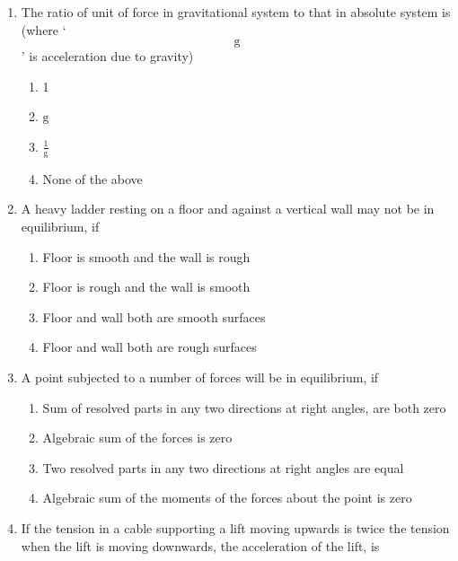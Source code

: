 \documentclass[11pt,a4paper]{article}
\begin{document}
\begin{enumerate}
\\
\item{The ratio of unit of force in gravitational system to that in absolute system is (where `$${\text{g}}$$' is acceleration due to gravity)
}
\begin{enumerate}[label=\Alph*.]
\item{1}
\item{$ {\text{g}} $}
\item{$ \frac{1}{{\text{g}}} $}
\item{None of the above}
\end{enumerate}
\item{A heavy ladder resting on a floor and against a vertical wall may not be in equilibrium, if}
\begin{enumerate}[label=\Alph*.]
\item{Floor is smooth and the wall is rough}
\item{Floor is rough and the wall is smooth}
\item{Floor and wall both are smooth surfaces}
\item{Floor and wall both are rough surfaces}
\end{enumerate}
\item{A point subjected to a number of forces will be in equilibrium, if}
\begin{enumerate}[label=\Alph*.]
\item{Sum of resolved parts in any two directions at right angles, are both zero}
\item{Algebraic sum of the forces is zero}
\item{Two resolved parts in any two directions at right angles are equal}
\item{Algebraic sum of the moments of the forces about the point is zero}
\end{enumerate}
\item{If the tension in a cable supporting a lift moving upwards is twice the tension when the lift is moving downwards, the acceleration of the lift, is}
\\\begin{enumerate*}[itemjoin=\qquad, label=\Alph*.]

\end{enumerate*}
\end{enumerate}
\end{document}
